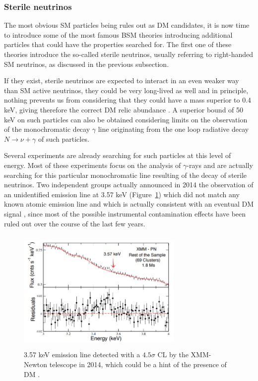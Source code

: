 \documentclass[a4paper, 10pt, openright]{report}
\begin{document}
\subsubsection*{Sterile neutrinos}
The most obvious \ac{SM} particles being rules out as \ac{DM} candidates, it is now time to introduce some of the most famous \ac{BSM} theories introducing additional particles that could have the properties searched for. The first one of these theories introduce the so-called sterile neutrinos, usually referring to right-handed \ac{SM} neutrinos, as discussed in the previous subsection. 

If they exist, sterile neutrinos are expected to interact in an even weaker way than \ac{SM} active neutrinos, they could be very long-lived as well and in principle, nothing prevents us from considering that they could have a mass superior to 0.4 keV, giving therefore the correct \ac{DM} relic abundance \cite{keVSterile}. A superior bound of 50 keV on such particles can also be obtained considering limits on the observation of the monochromatic decay $\gamma$ line originating from the one loop radiative decay $N \rightarrow \nu + \gamma$ of such particles.

Several experiments are already searching for such particles at this level of energy. Most of these experiments focus on the analysis of $\gamma$-rays and are actually searching for this particular monochromatic line resulting of the decay of sterile neutrinos. Two independent groups actually announced in 2014 the observation of an unidentified emission line at 3.57 keV (Figure~\ref{fig:DMDetection}) which did not match any known atomic emission line and which is actually consistent with an eventual \ac{DM} signal \cite{DMDetection1, DMDetection2}, since most of the possible instrumental contamination effects have been ruled out over the course of the last few years.

\begin{figure}[htbp]
\begin{center}
\includegraphics[width=8cm, height=6cm]{figs/DMDetection.png}
\caption{3.57 keV emission line detected with a $4.5 \sigma$ \ac{CL} by the XMM-Newton telescope in 2014, which could be a hint of the presence of \ac{DM} \cite{DMDetection1}.}
\label{fig:DMDetection}
\end{center}
\end{figure}
\end{document}
